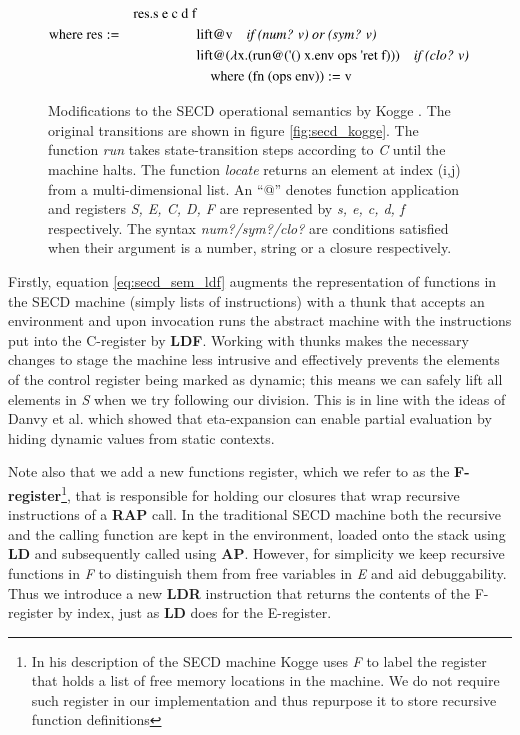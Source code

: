 \documentclass[a4paper,12pt,twoside,openright]{report}
\theoremstyle{definition}
\newcommand{\ts}{\textquotesingle}
\begin{document}
\begin{figure}[htp!]
\begin{alignat}{5}
		 && \text{res.s e c d f}   \\
		 \text{where res} & := && \text{lift@v\quad \textit{if (num? v) or (sym? v)}} \nonumber \\
		 & && \text{lift@($\lambda$x.(run@({\ts}() x.env ops {\ts}ret f)))} \quad\text{\textit{if (clo? v)}} \nonumber \\
		 & && \quad \text{where (fn (ops env))}:= \text{v} \nonumber
\end{alignat}
\caption{Modifications to the SECD operational semantics by Kogge \cite{kogge1990architecture}. The original transitions are shown in figure \ref{fig:secd_kogge}. The function \textit{run} takes state-transition steps according to \textit{C} until the machine halts. The function \textit{locate} returns an element at index (i,j) from a multi-dimensional list. An ``@'' denotes function application and registers \textit{S, E, C, D, F} are represented by \textit{s, e, c, d, f} respectively. The syntax \textit{num?/sym?/clo?} are conditions satisfied when their argument is a number, string or a closure respectively.}
\label{fig:secd_semantics_noset}
\end{figure}
\endgroup
\newpage

Firstly, equation \ref{eq:secd_sem_ldf} augments the representation of functions in the SECD machine (simply lists of instructions) with a thunk that accepts an environment and upon invocation runs the abstract machine with the instructions put into the C-register by \textbf{LDF}. Working with thunks makes the necessary changes to stage the machine less intrusive and effectively prevents the elements of the control register being marked as dynamic; this means we can safely lift all elements in \textit{S} when we try following our division. This is in line with the ideas of Danvy et al. \cite{danvy1995essence} which showed that eta-expansion can enable partial evaluation by hiding dynamic values from static contexts.

Note also that we add a new functions register, which we refer to as the \textbf{F-register}\footnote{In his description of the SECD machine Kogge \cite{kogge1990architecture} uses \textit{F} to label the register that holds a list of free memory locations in the machine. We do not require such register in our implementation and thus repurpose it to store recursive function definitions}, that is responsible for holding our closures that wrap recursive instructions of a \textbf{RAP} call. In the traditional SECD machine both the recursive and the calling function are kept in the environment, loaded onto the stack using \textbf{LD} and subsequently called using \textbf{AP}. However, for simplicity we keep recursive functions in \textit{F} to distinguish them from free variables in \textit{E} and aid debuggability. Thus we introduce a new \textbf{LDR} instruction that returns the contents of the F-register by index, just as \textbf{LD} does for the E-register.
\end{document}
